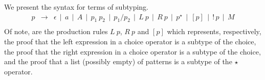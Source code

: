 We present the syntax for terms of subtyping.
\[
   \begin{array}{lcl}
      p & \to & \epsilon \, \mid \, a \, \mid \, A \,
                    \mid \,  p_1\:p_2 \, \mid \,  p_1 / p_2 \,
                    \mid \, L\:p \, \mid \, R\:p \,
                    \mid \, p^\star \, \mid \, [p] \,
                    \mid \, !\,p \, \mid \, M \\
   \end{array}
\]
Of note, are the production rules \(L\:p\), \(R\:p\) and \([p]\) which represents,
respectively, the proof that the left expression in a choice operator is a subtype
of the choice, the proof that the right expression in a choice operator is a subtype
of the choice, and the proof that a list (possibly empty) of patterns is a subtype
of the \(\star\) operator.

